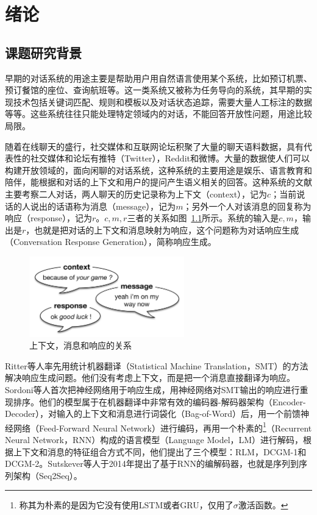 \usepackage{graphicx}


\chapter{绪论}\label{ch:绪论}

\section{课题研究背景}\label{sec:课题研究背景}
早期的对话系统的用途主要是帮助用户用自然语言使用某个系统，比如预订机票、预订餐馆的座位、查询航班等。这一类系统又被称为任务导向的系统，其早期的实现技术包括关键词匹配、规则和模板以及对话状态追踪，需要大量人工标注的数据等等。这些系统往往只能处理特定领域内的对话，不能回答开放性问题，用途比较局限。

随着在线聊天的盛行，社交媒体和互联网论坛积聚了大量的聊天语料数据，具有代表性的社交媒体和论坛有推特（Twitter），Reddit和微博。大量的数据使人们可以构建开放领域的，面向闲聊的对话系统，这种系统的主要用途是娱乐、语言教育和陪伴，能根据和对话的上下文和用户的提问产生语义相关的回答。这种系统的文献主要考察二人对话，两人聊天的历史记录称为上下文（context），记为$c$；当前说话的人说出的话语称为消息（message），记为$m$；另外一个人对该消息的回复称为响应（response），记为$r$。$c,m,r$三者的关系如图~\ref{fig:context_message_response}所示。系统的输入是$c,m$，输出是$r$，也就是把对话的上下文和消息映射为响应，这个问题称为对话响应生成（Conversation Response Generation），简称响应生成。

\begin{figure}[H]
    \includegraphics[width=0.6\textwidth]{figure/context_message_response.png}
    \centering
    \caption{上下文，消息和响应的关系
    }
    \label{fig:context_message_response}
\end{figure}

Ritter等人率先用统计机器翻译（Statistical Machine Translation，SMT）的方法解决响应生成问题。他们没有考虑上下文，而是把一个消息直接翻译为响应。Sordoni等人首次把神经网络用于响应生成，用神经网络对SMT输出的响应进行重现排序。他们的模型属于在机器翻译中非常有效的编码器-解码器架构（Encoder-Decoder），对输入的上下文和消息进行词袋化（Bag-of-Word）后，用一个前馈神经网络（Feed-Forward Neural Network）进行编码，再用一个朴素的\footnote{称其为朴素的是因为它没有使用LSTM或者GRU，仅用了$\sigma$激活函数。}（Recurrent Neural Network，RNN）构成的语言模型（Language Model，LM）进行解码，根据上下文和消息的特征组合方式不同，他们提出了三个模型：RLM，DCGM-1和DCGM-2。Sutskever等人于2014年提出了基于RNN的编解码器，也就是序列到序列架构（Seq2Seq）\upcite{}。

